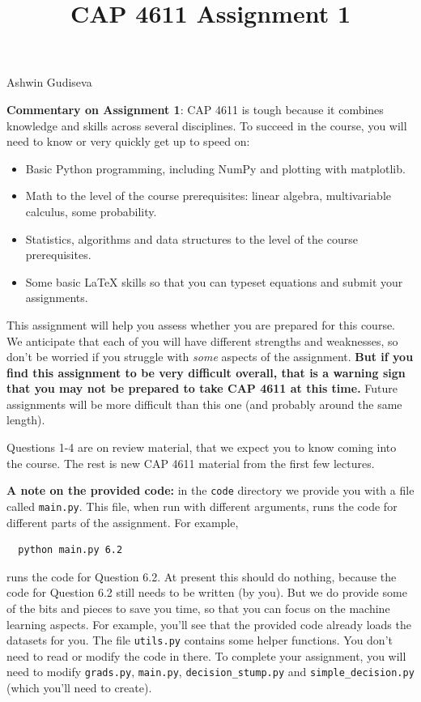 \documentclass{article}
\begin{document}
  \title{CAP 4611 Assignment 1}
  Ashwin Gudiseva
  \date{}
  \maketitle


  \textbf{Commentary on Assignment 1}: CAP 4611 is tough because it combines knowledge and skills across several disciplines. To succeed
  in the course, you will need to know or very quickly get up to speed on:
  \begin{itemize}
  \item Basic Python programming, including NumPy and plotting with matplotlib.
  \item Math to the level of the course prerequisites: linear algebra, multivariable calculus, some probability.
  \item Statistics, algorithms and data structures to the level of the course prerequisites.
  \item Some basic LaTeX skills so that you can typeset equations and submit your assignments.
  \end{itemize}

  This assignment will help you assess whether you are prepared for this course. We anticipate that each
  of you will have different strengths and weaknesses, so don't be worried if you struggle with \emph{some} aspects
  of the assignment. \textbf{But if you find this assignment
  to be very difficult overall, that is a warning sign that you may not be prepared to take CAP 4611
  at this time.} Future assignments will be more difficult than this one (and probably around the same length).

  Questions 1-4 are on review material, that we expect you to know coming into the course. The rest is new CAP 4611 material from the first few lectures.

  \textbf{A note on the provided code:} in the \texttt{code} directory we provide you with a file called
  \texttt{main.py}. This file, when run with different arguments, runs the code for different
  parts of the assignment. For example,
  \begin{verbatim}
  python main.py 6.2
  \end{verbatim}
  runs the code for Question 6.2. At present this should do nothing, because the code
  for Question 6.2 still needs to be written (by you). But we do provide some of the bits
  and pieces to save you time, so that you can focus on the machine learning aspects.
  For example, you'll see that the provided code already loads the datasets for you.
  The file \texttt{utils.py} contains some helper functions.
  You don't need to read or modify the code in there.
  To complete your assignment, you will need to modify \texttt{grads.py}, \texttt{main.py}, \texttt{decision\string_stump.py} and \texttt{simple\string_decision.py} (which you'll need to create).
\end{document}
